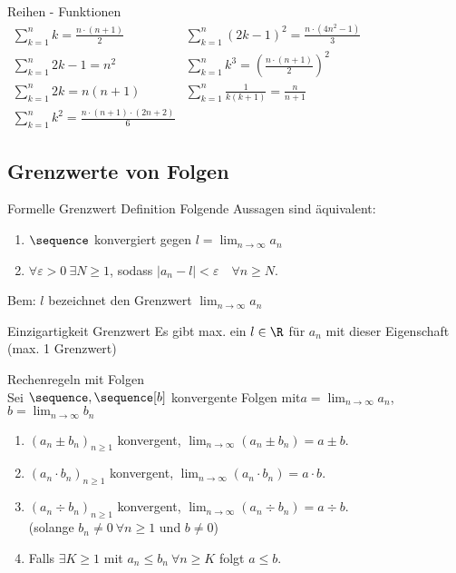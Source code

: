     \begin{definition}{Reihen - Funktionen}\\
        $
        \begin{array}{ll}
            \sum^{n}_{k=1} k = \frac{n \cdot (n+1)}{2} & \sum^{n}_{k=1} (2k - 1)^2 = \frac{n \cdot (4n^2-1)}{3}\\
            \sum^{n}_{k=1} 2k-1 = n^2 & \sum^{n}_{k=1} k^3 = \left( \frac{n \cdot (n+1)}{2}\right)^2\\
            \sum^{n}_{k=1} 2k = n(n+1) & \sum^{n}_{k=1} \frac{1}{k(k+1)} = \frac{n}{n+1}\\
            \sum^{n}_{k=1} k^2 = \frac{n \cdot (n+1) \cdot (2n+2)}{6} &
        \end{array}
        $
    \end{definition}





\subsection{Grenzwerte von Folgen}

\begin{definition}{Formelle Grenzwert Definition}
    Folgende Aussagen sind äquivalent:
    \begin{enumerate}
        \item $\sequence$ konvergiert gegen $l = \lim_{n \to \infty} a_n$
        \item $\forall \varepsilon > 0~\exists N \geq 1$, sodass $|a_n -l | < \varepsilon \quad \forall n \geq N$.
    \end{enumerate}
\end{definition}
Bem: $l$ bezeichnet den Grenzwert $\lim_{n \to \infty} a_n$
\begin{lemma}{Einzigartigkeit Grenzwert}
     Es gibt max. ein $l \in \R$ für $a_n$ mit dieser Eigenschaft (max. 1 Grenzwert)
\end{lemma}
\begin{theorem}{Rechenregeln mit Folgen}
    \\Sei $\sequence,\sequence[b]$ konvergente Folgen mit$a = \lim_{n \to \infty} a_n$, $b = \lim_{n \to \infty} b_n$
    \begin{enumerate}
        \item $(a_n \pm b_n)_{n \geq 1}$ konvergent, $\lim_{n \to \infty} (a_n \pm b_n) = a \pm b$.
        \item $(a_n \cdot b_n)_{n \geq 1}$ konvergent, $\lim_{n \to \infty} (a_n \cdot b_n) = a \cdot b$.
        \item $(a_n \div  b_n)_{n \geq 1}$ konvergent, $\lim_{n \to \infty} (a_n \div b_n) = a \div b$.
        \\(solange $b_n \neq 0 ~ \forall n \geq 1$ und $b \neq 0$)
        \item Falls $\exists K \geq 1$ mit $a_n \leq b_n ~ \forall n \geq K$ folgt $a \leq b$.
    \end{enumerate}
\end{theorem}

